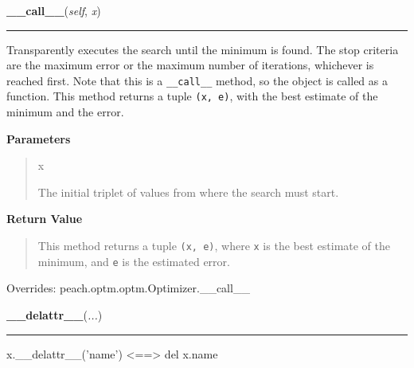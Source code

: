     \vspace{0.5ex}

    \begin{boxedminipage}{\textwidth}

    \raggedright \textbf{\_\_call\_\_}(\textit{self}, \textit{x})

    \vspace{-1.5ex}

    \rule{\textwidth}{0.5\fboxrule}

Transparently executes the search until the minimum is found. The stop
criteria are the maximum error or the maximum number of iterations,
whichever is reached first. Note that this is a \texttt{{\_}{\_}call{\_}{\_}} method, so
the object is called as a function. This method returns a tuple
\texttt{(x, e)}, with the best estimate of the minimum and the error.
    \vspace{1ex}

      \textbf{Parameters}
      \begin{quote}
        \begin{Ventry}{x}

          \item[x]


The initial triplet of values from where the search must start.
        \end{Ventry}

      \end{quote}

    \vspace{1ex}

      \textbf{Return Value}
      \begin{quote}

This method returns a tuple \texttt{(x, e)}, where \texttt{x} is the best
estimate of the minimum, and \texttt{e} is the estimated error.
      \end{quote}

    \vspace{1ex}

      Overrides: peach.optm.optm.Optimizer.\_\_call\_\_

    \end{boxedminipage}

    \label{object:__delattr__}

    \vspace{0.5ex}

    \begin{boxedminipage}{\textwidth}

    \raggedright \textbf{\_\_delattr\_\_}(\textit{...})

    \vspace{-1.5ex}

    \rule{\textwidth}{0.5\fboxrule}

x.{\_}{\_}delattr{\_}{\_}('name') {\textless}=={\textgreater} del x.name
    \vspace{1ex}

    \end{boxedminipage}

